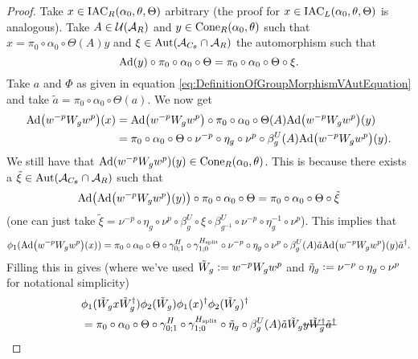 \documentclass[11pt,a4paper,twoside]{article}
\numberwithin{equation}{section}
\begin{document}
	\begin{proof}
		Take $x\in \textrm{IAC}_R(\alpha_0,\theta,\Theta)$ arbitrary (the proof for $x\in \textrm{IAC}_L(\alpha_0,\theta,\Theta)$ is analogous). Take $A\in\mathcal U(\mathcal A_R)$ and $y\in\textrm{Cone}_R(\alpha_0,\theta)$ such that $x=\pi_0\circ\alpha_0\circ\Theta(A)y$ and $\xi\in\Aut{\AA_{C_\theta}\cap \AA_R}$ the automorphism such that
		\begin{equation}
			\Ad{y}\circ\pi_0\circ\alpha_0\circ\Theta=\pi_0\circ\alpha_0\circ\Theta\circ\xi.
		\end{equation}
		Take $a$ and $\Phi$ as given in equation \eqref{eq:DefinitionOfGroupMorphismVAutEquation} and take $\tilde{a}=\pi_0\circ\alpha_0\circ\Theta(a)$. We now get
		\begin{align}
			\Ad{w^{-p}W_gw^{p}} (x) &=\Ad{w^{-p}W_gw^{p}}\circ\pi_0\circ\alpha_0\circ\Theta(A) \Ad{w^{-p}W_gw^{p}}(y)\\
			&=\pi_0\circ\alpha_0\circ\Theta\circ\nu^{-p}\circ\eta_g\circ\nu^{p}\circ\beta_g^U(A) \Ad{w^{-p}W_gw^{p}}(y).
		\end{align}
		We still have that $\Ad{w^{-p}W_gw^{p}}(y)\in\cone_R(\alpha_0,\theta)$. This is because there exists a $\tilde{\xi}\in\Aut{\AA_{C_\theta}\cap \AA_R}$ such that
		\begin{equation}
			\Ad{\Ad{w^{-p}W_gw^{p}}(y)}\circ \pi_0\circ\alpha_0\circ\Theta=\pi_0\circ\alpha_0\circ\Theta\circ\tilde\xi
		\end{equation}
		(one can just take $\tilde\xi=\nu^{-p}\circ\eta_g\circ\nu^{p}\circ\beta_g^U\circ\xi\circ\beta_{g^{-1}}^U\circ\nu^{-p}\circ\eta_g^{-1}\circ\nu^{p}$). This implies that
		\begin{equation}\label{eq:lem:phi1phi2matchingCondition:Proof_W_g_PartAppendix}
			\phi_1(\Ad{w^{-p}W_gw^{p}}(x))=\pi_0\circ\alpha_0\circ\Theta\circ\gamma^{H}_{0;1}\circ\gamma^{\Hsplit}_{1;0}\circ\nu^{-p}\circ\eta_g\circ\nu^{p}\circ\beta_g^U(A)\tilde{a}\Ad{w^{-p}W_gw^{p}}(y)\tilde{a}^\dagger.
		\end{equation}
		Filling this in gives (where we've used $\tilde{W}_g\vcentcolon= w^{-p}W_g w^{p}$ and $\tilde{\eta}_g\vcentcolon= \nu^{-p}\circ\eta_g\circ\nu^{p}$ for notational simplicity)
		\begin{align}
			&\phi_1(\tilde{W}_gx\tilde{W}_g^\dagger)\phi_2(\tilde{W}_g)\phi_1(x)^\dagger\phi_2(\tilde{W}_g)^\dagger\\
			\label{eq:phi1phi2matchingConditionEquationAppendix}
			&=\pi_0\circ\alpha_0\circ\Theta\circ\gamma^{H}_{0;1}\circ\gamma^{\Hsplit}_{1;0}\circ\tilde{\eta}_g\circ\beta_g^U(A)\tilde{a}\tilde{W}_g\stkout{y\tilde{W}_g^\dagger\tilde{a}^\dagger}\\

\end{align}
\end{proof}
\end{document}
